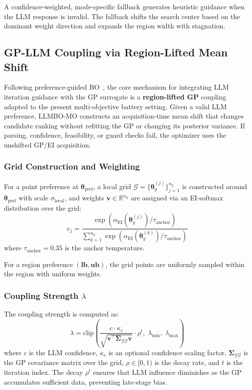 \documentclass[journal]{IEEEtran}
\newcommand{\btheta}{\boldsymbol{\theta}}
\newcommand{\bG}{\mathcal{G}}
\newcommand{\R}{\mathbb{R}}
\begin{document}
A confidence-weighted, mode-specific fallback generates heuristic guidance when the LLM response is invalid. The fallback shifts the search center based on the dominant weight direction and expands the region width with stagnation.

\subsection{GP-LLM Coupling via Region-Lifted Mean Shift}
\label{sec:coupling}

Following preference-guided BO~\cite{ref17}, the core mechanism for integrating LLM iteration guidance with the GP surrogate is a \textbf{region-lifted GP} coupling adapted to the present multi-objective battery setting. Given a valid LLM preference, LLMBO-MO constructs an acquisition-time mean shift that changes candidate ranking without refitting the GP or changing its posterior variance. If parsing, confidence, feasibility, or guard checks fail, the optimizer uses the unshifted GP/EI acquisition.

\subsubsection{Grid Construction and Weighting}

For a point preference at $\btheta_{\text{pref}}$, a local grid $\bG = \{\btheta_g^{(j)}\}_{j=1}^{n_g}$ is constructed around $\btheta_{\text{pref}}$ with scale $\sigma_{\text{local}}$, and weights $\mathbf{v} \in \R^{n_g}$ are assigned via an EI-softmax distribution over the grid:
\begin{equation}
v_j = \frac{\exp(\alpha_{\text{EI}}(\btheta_g^{(j)}) / \tau_{\text{anchor}})}{\sum_{k=1}^{n_g} \exp(\alpha_{\text{EI}}(\btheta_g^{(k)}) / \tau_{\text{anchor}})}
\label{eq:anchor_weights}
\end{equation}
where $\tau_{\text{anchor}} = 0.35$ is the anchor temperature.

For a region preference $(\mathbf{lb}, \mathbf{ub})$, the grid points are uniformly sampled within the region with uniform weights.

\subsubsection{Coupling Strength $\lambda$}

The coupling strength is computed as:
\begin{equation}
\lambda = \text{clip}\!\left(\frac{c \cdot \kappa_c}{\sqrt{\mathbf{v}^\top \boldsymbol{\Sigma}_{\bG\bG} \mathbf{v}}} \cdot \rho^{t},\; \lambda_{\min},\; \lambda_{\max}\right)
\label{eq:lambda}
\end{equation}
where $c$ is the LLM confidence, $\kappa_c$ is an optional confidence scaling factor, $\boldsymbol{\Sigma}_{\bG\bG}$ is the GP covariance matrix over the grid, $\rho \in [0,1)$ is the decay rate, and $t$ is the iteration index. The decay $\rho^t$ ensures that LLM influence diminishes as the GP accumulates sufficient data, preventing late-stage bias.
\end{document}
